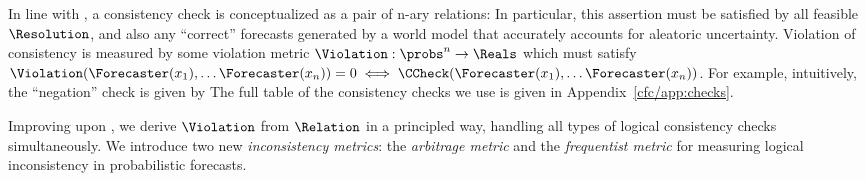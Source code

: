 In line with \cite{esmwcc}, a consistency check is conceptualized as a pair of n-ary relations: 
In particular, this assertion must be satisfied by all feasible $\Resolution$, and also any ``correct'' forecasts generated by a world model that accurately accounts for aleatoric uncertainty.
Violation of consistency is measured by some violation metric $\Violation:\probs^n\to\Reals$ which must satisfy $\Violation(\Forecaster(x_1),\dots\Forecaster(x_n))=0\iff\CCheck(\Forecaster(x_1),\dots\Forecaster(x_n))$.
%
For example, intuitively, the ``negation'' check \NegChecker{} is given by 
The full table of the consistency checks we use is given in Appendix~\ref{cfc/app:checks}.

Improving upon \cite{esmwcc}, we derive $\Violation$
from $\Relation$ in a principled way,
handling all types of logical consistency checks simultaneously.
We introduce two new \emph{inconsistency metrics}: the \emph{arbitrage metric} and the \emph{frequentist metric} for measuring logical inconsistency in probabilistic forecasts.

\label{cfc/sec:arbitrage}

\NewDocumentCommand{\argmaxmax}{}{\mathop{(\argmax,\max)}}

